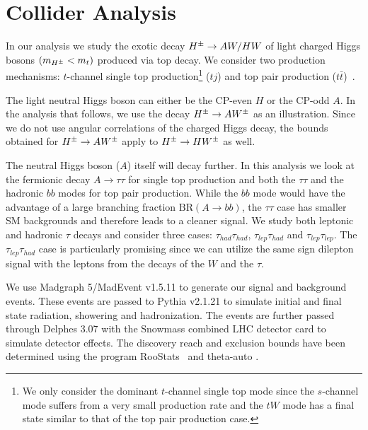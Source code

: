  



\section{Collider Analysis}
 \label{sec:analysis}


In our analysis we study the exotic decay $H^{\pm} \rightarrow AW/HW$ of light charged Higgs bosons $(m_{H^{\pm}}<m_t)$ produced via top decay. We consider two production mechanisms: $t$-channel single top production\footnote{We only consider the dominant $t$-channel single top mode since the $s$-channel mode suffers from a very small production rate and the $tW$ mode has a final state similar to that of the  top pair production case.} ($tj$) and top pair production ($t\bar{t}$)~\cite{Kidonakis:2012db}. 

 
 The light neutral Higgs boson can either be the CP-even $H$ or the CP-odd $A$. In the analysis that follows, we use the decay $H^{\pm} \rightarrow A W^{\pm}$ as an illustration. Since we do not  use  angular correlations of the charged Higgs decay,  the bounds obtained for $H^{\pm} \rightarrow A W^{\pm}$ apply to  $H^{\pm} \rightarrow H W^{\pm}$ as well.

The neutral Higgs boson ($A$) itself  will decay further. In this analysis we  look at the fermionic decay $A \rightarrow\tau\tau$ for single top production and both the $\tau\tau$ and the hadronic $bb$  modes  for top pair production.  While the $bb$  mode would have the advantage of a large branching fraction $\text{BR}(A \rightarrow bb)$, the $\tau\tau$ case has smaller SM backgrounds and therefore leads to a cleaner signal. We study both leptonic and hadronic $\tau$ decays and consider  three cases: $\tau_{had}\tau_{had}$,  $\tau_{lep}\tau_{had}$ and  $\tau_{lep}\tau_{lep}$.  The $\tau_{lep}\tau_{had}$ case is particularly promising since we can utilize the same sign dilepton signal with the leptons from the decays of the $W$ and the $\tau$.  

We use Madgraph 5/MadEvent v1.5.11 \cite{Allwall:2011uj,Alwall2014} to generate our signal and background events.  These events are passed to Pythia v2.1.21 \cite{Sjostrand:2006za}  to simulate initial and final state radiation,  showering and hadronization. The events are further passed through Delphes 3.07 \cite{Ovyn:2009tx} with the Snowmass combined LHC detector card \cite{Anderson:2013kxz} to simulate detector effects. The discovery reach and exclusion bounds have been determined using the program RooStats~\cite{Moneta:2010pm} and theta-auto \cite{thetaauto}.  


